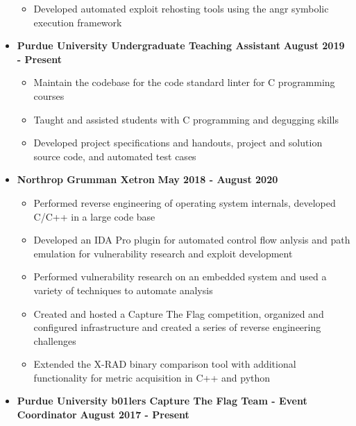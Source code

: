 \documentclass[letterpaper,10pt]{article}
\begin{document}
\begin{flushleft}
\begin{itemize}
\begin{itemize}
                \item Developed automated exploit rehosting tools using the angr symbolic execution framework \\
            \end{itemize}
        \item \textbf{Purdue University Undergraduate Teaching Assistant} \hfill \textbf{August 2019 - Present} \\
            \begin{itemize}
                \item Maintain the codebase for the code standard linter for C programming courses \\
                \item Taught and assisted students with C programming and degugging skills \\
                \item Developed project specifications and handouts, project and solution source code, and automated test cases \\
            \end{itemize}
		\item \textbf{Northrop Grumman Xetron} \hfill \textbf{May 2018 - August 2020} \\
			\begin{itemize}
                \item Performed reverse engineering of operating system internals, developed C/C++ in a large code base \\
				\item Developed an IDA Pro plugin for automated control flow anlysis and path emulation for vulnerability research and exploit development \\
				\item Performed vulnerability research on an embedded system and used a variety of techniques to automate analysis \\
				\item Created and hosted a Capture The Flag competition, organized and configured infrastructure and created a series of reverse engineering challenges \\
				\item Extended the X-RAD binary comparison tool with additional functionality for metric acquisition in C++ and python \\
			\end{itemize}
		\item \textbf{Purdue University b01lers Capture The Flag Team - Event Coordinator} \hfill \textbf{August 2017 - Present} \\

\end{itemize}
\end{flushleft}
\end{document}

